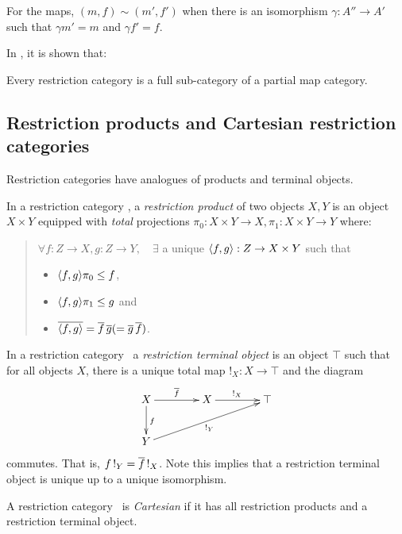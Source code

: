 For the maps, $(m,f) \sim (m',f')$ when there is an isomorphism $\gamma : A'' \to A'$
such that $\gamma m' = m$ and $\gamma f' = f$.

In \cite{cockettlack2003:restcategories2}, it is shown that:
\begin{theorem}
  Every restriction category is a full sub-category of a partial map category.
\end{theorem}
\subsection{Restriction products and Cartesian restriction categories} %
\label{sub:restriction_products_and_cartesian_restriction_categories}


Restriction categories have analogues of products and terminal objects.

\begin{definition}
  In a restriction category \X, a \emph{restriction product}  of two objects $X, Y$ is an
  object $X\times Y$ equipped with \emph{total} projections
  $\pi_0:X\times Y\to X, \pi_1:X\times Y\to Y $ where:
  \begin{quote}
    $\forall f:Z\to X, g: Z\to Y,\quad \exists$ a unique $\langle f,g\rangle:Z \to X\times Y$ such that
    \begin{itemize}
      \item $\langle f,g\rangle \pi_0 \le f$,
      \item $\langle f,g\rangle \pi_1 \le g$ and
      \item $\overline{\langle f,g\rangle} = \overline{f}\, \overline{g} ( = \overline{g}\, \overline{f})$.
    \end{itemize}
  \end{quote}
\end{definition}

\begin{definition}
  In a restriction category \X\, a \emph{restriction terminal object}
  is an object $\top$ such that for all objects $X$, there is a
  unique total map $!_X : X \to \top$ and the diagram
  \[
    \xymatrix @C=40pt @R=25pt{
      X \ar[r]^{\restr{f}} \ar[d]^{f} & X \ar[r]^{!_X}  &\top  \\
      Y \ar[urr]_{!_Y}
    }
  \]
  commutes. That is,  $f\, !_Y = \overline{f}\, !_X$. Note this implies
  that a restriction terminal object is unique up to a unique isomorphism.
\end{definition}

\begin{definition}
  A restriction category \X\ is \emph{Cartesian} if it has all restriction products
  and a restriction terminal object.
\end{definition}

